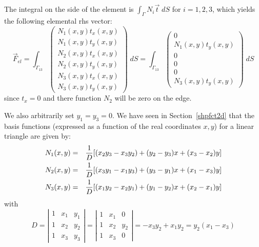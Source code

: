 The integral on the side of the element is $\int_\Gamma N_i {\vec t} \; dS$
for $i=1,2,3$, which yields the following elemental rhs vector:
\[
\vec{F}_{el}=
\int_{\Gamma_{13}} 
\left(
\begin{array}{c}
N_1(x,y) t_x(x,y)\\
N_1(x,y) t_y(x,y)\\
N_2(x,y) t_x(x,y)\\
N_2(x,y) t_y(x,y)\\
N_3(x,y) t_x(x,y)\\
N_3(x,y) t_y(x,y)
\end{array}
\right)
\; dS
=
\int_{\Gamma_{13}} 
\left(
\begin{array}{c}
0\\
N_1(x,y) t_y(x,y)\\
0\\
0\\
0\\
N_3(x,y) t_y(x,y)
\end{array}
\right)
\; dS
\]
since $t_x=0$ and there function $N_2$ will be zero on the edge.

We also arbitrarily set $y_1=y_3=0$. We have seen in Section~\ref{shpfct2d} that 
the basis functions (expressed as a function of the real coordinates $x,y$) 
for a linear triangle are given by:
\begin{eqnarray}
N_1(x,y) &=& \frac{1}{D}[(x_2y_3-x_3y_2) + (y_2-y_3)x + (x_3-x_2)y] \nonumber\\
N_2(x,y) &=& \frac{1}{D}[(x_3y_1-x_1y_3) + (y_3-y_1)x + (x_1-x_3)y] \nonumber\\
N_3(x,y) &=& \frac{1}{D}[(x_1y_2-x_2y_1) + (y_1-y_2)x + (x_2-x_1)y] \nonumber
\end{eqnarray}
with 
\[
D = 
\left|
\begin{array}{ccc}
1 & x_1 & y_1 \\
1 & x_2 & y_2 \\
1 & x_3 & y_3 
\end{array}
\right|
=
\left|
\begin{array}{ccc}
1 & x_1 & 0 \\
1 & x_2 & y_2 \\
1 & x_3 & 0 
\end{array}
\right|
=
-x_3y_2+x_1y_2
= y_2(x_1-x_3)
\]


